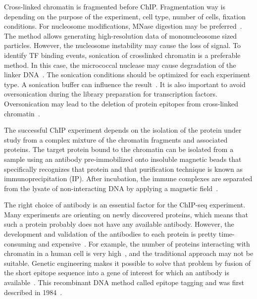 Cross-linked chromatin is fragmented before ChIP. 
Fragmentation way is depending on the purpose of the experiment, cell type, number of cells, fixation conditions. 
For nucleosome modifications, MNase digestion may be preferred~\cite{kidder2011chip}.  
The method allows generating high-resolution data of mononucleosome sized particles. 
However, the nucleosome instability may cause the loss of signal.
To identify TF binding events, sonication of crosslinked chromatin is a preferable method. 
In this case, the micrococcal nuclease may cause degradation of the linker DNA~\cite{kidder2011chip}.
The sonication conditions should be optimized for each experiment type. 
A sonication buffer can influence the result~\cite{steger2008dot1l}. 
It is also important to avoid oversonication during the library preparation for transcription factors. 
Oversonication may lead to the deletion of protein epitopes from cross-linked chromatin~\cite{ostrow2015chip}. 


The successful ChIP experiment depends on the isolation of the protein under study from a complex mixture of the chromatin fragments and associated proteins. 
The target protein bound to the chromatin can be isolated from a sample using an antibody pre-immobilized onto insoluble magnetic beads that specifically recognizes that protein and that purification technique is known as immunoprecipitation (IP). 
After incubation, the immune complexes are separated from the lysate of non-interacting DNA by applying a magnetic field~\cite{slovakova2005use}.

The right choice of antibody is an essential factor for the ChIP-seq experiment. 
Many experiments are orienting on newly discovered proteins, which means that such a protein probably does not have any available antibody. 
However, the development and validation of the antibodies to each protein is pretty time-consuming and expensive~\cite{jarvik1998epitope}. 
For example, the number of proteins interacting with chromatin in a human cell is very high~\cite{ramani2005consolidating}, and the traditional approach may not be suitable.
Genetic engineering makes it possible to solve that problem by fusion of the short epitope sequence into a gene of interest for which an antibody is available~\cite{jarvik1998epitope,brizzard2008epitope,goldberg2010distinct}. 
This recombinant DNA method called epitope tagging and was first described in 1984~\cite{munro1984use}. 













